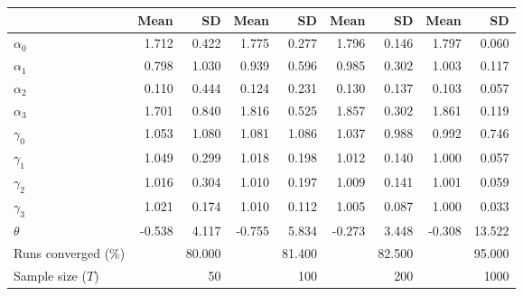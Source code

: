 
\begin{tabular}[t]{lrrrrrrrr}
\toprule
  & Mean & SD & Mean  & SD  & Mean   & SD   & Mean    & SD   \\
\midrule
$\alpha_{0}$ & 1.712 & 0.422 & 1.775 & 0.277 & 1.796 & 0.146 & 1.797 & 0.060\\
$\alpha_{1}$ & 0.798 & 1.030 & 0.939 & 0.596 & 0.985 & 0.302 & 1.003 & 0.117\\
$\alpha_{2}$ & 0.110 & 0.444 & 0.124 & 0.231 & 0.130 & 0.137 & 0.103 & 0.057\\
$\alpha_{3}$ & 1.701 & 0.840 & 1.816 & 0.525 & 1.857 & 0.302 & 1.861 & 0.119\\
$\gamma_{0}$ & 1.053 & 1.080 & 1.081 & 1.086 & 1.037 & 0.988 & 0.992 & 0.746\\
$\gamma_{1}$ & 1.049 & 0.299 & 1.018 & 0.198 & 1.012 & 0.140 & 1.000 & 0.057\\
$\gamma_{2}$ & 1.016 & 0.304 & 1.010 & 0.197 & 1.009 & 0.141 & 1.001 & 0.059\\
$\gamma_{3}$ & 1.021 & 0.174 & 1.010 & 0.112 & 1.005 & 0.087 & 1.000 & 0.033\\
$\theta$ & -0.538 & 4.117 & -0.755 & 5.834 & -0.273 & 3.448 & -0.308 & 13.522\\
Runs converged (\%) &  & 80.000 &  & 81.400 &  & 82.500 &  & 95.000\\
Sample size ($T$) &  & 50 &  & 100 &  & 200 &  & 1000\\
\bottomrule
\end{tabular}
